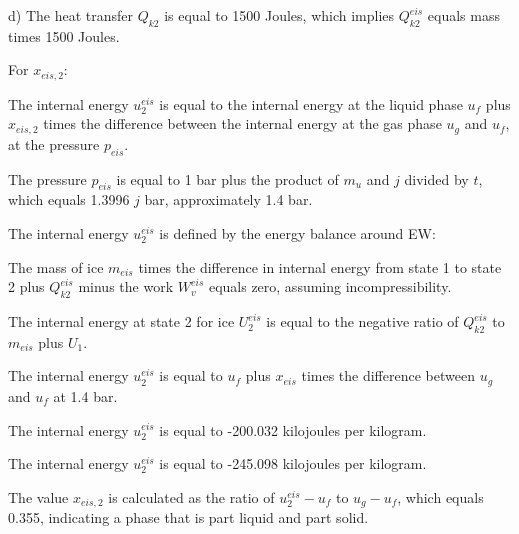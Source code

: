 d) The heat transfer \( Q_{k2} \) is equal to 1500 Joules, which implies \( Q_{k2}^{eis} \) equals mass times 1500 Joules.

For \( x_{eis,2} \):

The internal energy \( u_2^{eis} \) is equal to the internal energy at the liquid phase \( u_f \) plus \( x_{eis,2} \) times the difference between the internal energy at the gas phase \( u_g \) and \( u_f \), at the pressure \( p_{eis} \).

The pressure \( p_{eis} \) is equal to 1 bar plus the product of \( m_u \) and \( j \) divided by \( t \), which equals 1.3996 \( j \) bar, approximately 1.4 bar.

The internal energy \( u_2^{eis} \) is defined by the energy balance around EW:

The mass of ice \( m_{eis} \) times the difference in internal energy from state 1 to state 2 plus \( Q_{k2}^{eis} \) minus the work \( W_v^{eis} \) equals zero, assuming incompressibility.

The internal energy at state 2 for ice \( U_2^{eis} \) is equal to the negative ratio of \( Q_{k2}^{eis} \) to \( m_{eis} \) plus \( U_1 \).

The internal energy \( u_2^{eis} \) is equal to \( u_f \) plus \( x_{eis} \) times the difference between \( u_g \) and \( u_f \) at 1.4 bar.

The internal energy \( u_2^{eis} \) is equal to -200.032 kilojoules per kilogram.

The internal energy \( u_2^{eis} \) is equal to -245.098 kilojoules per kilogram.

The value \( x_{eis,2} \) is calculated as the ratio of \( u_2^{eis} - u_f \) to \( u_g - u_f \), which equals 0.355, indicating a phase that is part liquid and part solid.